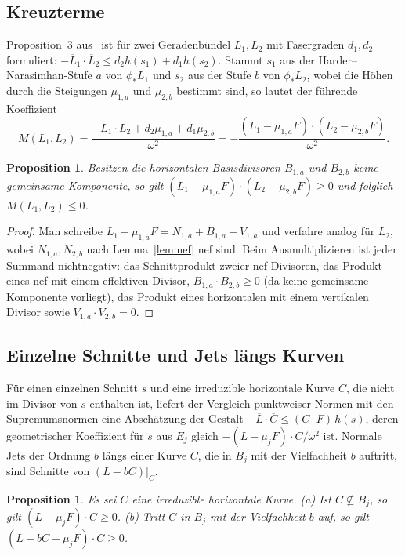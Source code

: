 \documentclass[11pt]{article}
\newtheorem{proposition}[theorem]{Proposition}
\theoremstyle{definition}
\theoremstyle{remark}
\newcommand{\Lb}{\overline{L}}
\begin{document}
\subsection{Kreuzterme}
Proposition~3 aus~\cite{So26} ist für zwei Geradenbündel $L_1,L_2$ mit Fasergraden
$d_1,d_2$ formuliert: $-\Lb_1\cdot\Lb_2\le d_2h(s_1)+d_1h(s_2)$. Stammt $s_1$ aus
der Harder--Narasimhan-Stufe $a$ von $\phi_*L_1$ und $s_2$ aus der Stufe $b$ von
$\phi_*L_2$, wobei die Höhen durch die Steigungen $\mu_{1,a}$ und $\mu_{2,b}$
bestimmt sind, so lautet der führende Koeffizient
\[
M(L_1,L_2)=\frac{-L_1\cdot L_2+d_2\mu_{1,a}+d_1\mu_{2,b}}{\omega^2}
=-\frac{(L_1-\mu_{1,a}F)\cdot(L_2-\mu_{2,b}F)}{\omega^2}.
\]

\begin{proposition}\label{prop:cross}
Besitzen die horizontalen Basisdivisoren $B_{1,a}$ und $B_{2,b}$ keine gemeinsame
Komponente, so gilt $(L_1-\mu_{1,a}F)\cdot(L_2-\mu_{2,b}F)\ge 0$ und folglich
$M(L_1,L_2)\le 0$.
\end{proposition}

\begin{proof}
Man schreibe $L_1-\mu_{1,a}F=N_{1,a}+B_{1,a}+V_{1,a}$ und verfahre analog für
$L_2$, wobei $N_{1,a},N_{2,b}$ nach Lemma~\ref{lem:nef} nef sind. Beim
Ausmultiplizieren ist jeder Summand nichtnegativ: das Schnittprodukt zweier nef
Divisoren, das Produkt eines nef mit einem effektiven Divisor,
$B_{1,a}\cdot B_{2,b}\ge 0$ (da keine gemeinsame Komponente vorliegt), das
Produkt eines horizontalen mit einem vertikalen Divisor sowie
$V_{1,a}\cdot V_{2,b}=0$.
\end{proof}

\subsection{Einzelne Schnitte und Jets längs Kurven}
Für einen einzelnen Schnitt $s$ und eine irreduzible horizontale Kurve $C$, die
nicht im Divisor von $s$ enthalten ist, liefert der Vergleich punktweiser Normen
mit den Supremumsnormen eine Abschätzung der Gestalt $-\Lb\cdot\overline C\le(C\cdot
F)\,h(s)$, deren geometrischer Koeffizient für $s$ aus $E_j$ gleich
$-(L-\mu_jF)\cdot C/\omega^2$ ist. Normale Jets der Ordnung $b$ längs einer Kurve
$C$, die in $B_j$ mit der Vielfachheit $b$ auftritt, sind Schnitte von
$(L-bC)|_C$.

\begin{proposition}\label{prop:curves}
Es sei $C$ eine irreduzible horizontale Kurve. (a) Ist $C\not\subseteq B_j$, so
gilt $(L-\mu_jF)\cdot C\ge 0$. (b) Tritt $C$ in $B_j$ mit der Vielfachheit $b$
auf, so gilt $(L-bC-\mu_jF)\cdot C\ge 0$.
\end{proposition}
\end{document}
